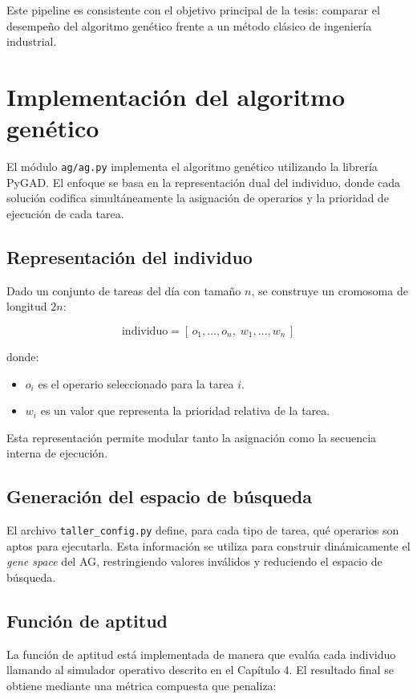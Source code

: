 Este pipeline es consistente con el objetivo principal de la tesis: comparar el desempeño del algoritmo genético frente a un método clásico de ingeniería industrial.

\section{Implementación del algoritmo genético}

El módulo \texttt{ag/ag.py} implementa el algoritmo genético utilizando la librería PyGAD. El enfoque se basa en la representación dual del individuo, donde cada solución codifica simultáneamente la asignación de operarios y la prioridad de ejecución de cada tarea.

\subsection{Representación del individuo}

Dado un conjunto de tareas del día con tamaño $n$, se construye un cromosoma de longitud $2n$:

\[
\text{individuo} = [\, o_1,\dots,o_n,\; w_1,\dots,w_n \,]
\]

donde:

\begin{itemize}
    \item $o_i$ es el operario seleccionado para la tarea $i$.
    \item $w_i$ es un valor que representa la prioridad relativa de la tarea.
\end{itemize}

Esta representación permite modular tanto la asignación como la secuencia interna de ejecución.

\subsection{Generación del espacio de búsqueda}

El archivo \texttt{taller\_config.py} define, para cada tipo de tarea, qué operarios son aptos para ejecutarla. Esta información se utiliza para construir dinámicamente el \textit{gene space} del AG, restringiendo valores inválidos y reduciendo el espacio de búsqueda.

\subsection{Función de aptitud}

La función de aptitud está implementada de manera que evalúa cada individuo llamando al simulador operativo descrito en el Capítulo 4. El resultado final se obtiene mediante una métrica compuesta que penaliza:

